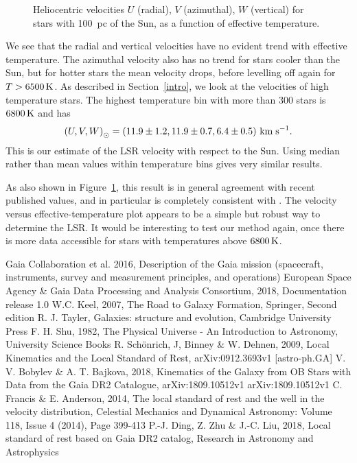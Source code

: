 \documentclass{aastex62}
\begin{document}
	\begin{figure}[ht!]
	\caption{Heliocentric velocities $U$ (radial), $V$ (azimuthal), $W$ (vertical) for stars with 100~pc of the Sun, as a function of effective temperature.\label{fig:lsrmean}}
	\end{figure}

We see that the radial and vertical velocities have no evident trend with effective temperature.  The azimuthal velocity also has no trend for stars cooler than the Sun, but for hotter stars the mean velocity drops, before levelling off again for $T>6500\rm\,K$.  As described in Section~\ref{intro}, we look at the velocities of high temperature stars. The highest temperature bin with more than 300 stars is $6800\rm\,K$ and has
$$ \left( U, V, W\right)_\odot=\left( 11.9\pm1.2, 11.9\pm0.7, 6.4\pm0.5 \right) \rm\,km\;s^{-1}.$$
This is our estimate of the LSR velocity with respect to the Sun.  Using median rather than mean values within temperature bins gives very similar results.

As also shown in Figure~\ref{fig:lsrmean}, this result is in general agreement with recent published values, and in particular is completely consistent with \cite{schoenrich}.  The velocity versus effective-temperature plot appears to be
a simple but robust way to determine the LSR. It would be interesting to test our method again, once there is more data accessible for stars with temperatures above $6800\rm\,K$.


	\begin{thebibliography}{}
		
		 Gaia Collaboration et al. 2016, Description of the Gaia mission (spacecraft, instruments, survey and measurement principles, and operations)
		 European Space Agency \& Gaia Data Processing and Analysis Consortium, 2018, Documentation release 1.0
		W.C. Keel, 2007, The Road to Galaxy Formation, Springer, Second edition
		 R. J. Tayler, Galaxies: structure and evolution, Cambridge University Press
		 F. H. Shu, 1982, The Physical Universe - An Introduction to Astronomy, University Science Books
		 R. Sch\"{o}nrich, J, Binney \& W. Dehnen, 2009, Local Kinematics and the Local Standard of Rest, arXiv:0912.3693v1 [astro-ph.GA]
		 V. V. Bobylev \& A. T. Bajkova, 2018, Kinematics of the Galaxy from OB Stars with Data from the Gaia DR2 Catalogue, arXiv:1809.10512v1 arXiv:1809.10512v1
		 C. Francis \& E. Anderson, 2014, The local standard of rest and the well in the velocity distribution, Celestial Mechanics and Dynamical Astronomy: Volume 118, Issue 4 (2014), Page 399-413
		 P.-J. Ding, Z. Zhu \& J.-C. Liu, 2018, Local standard of rest based on Gaia DR2 catalog, Research in Astronomy and Astrophysics
		
	\end{thebibliography}
	
\end{document}
